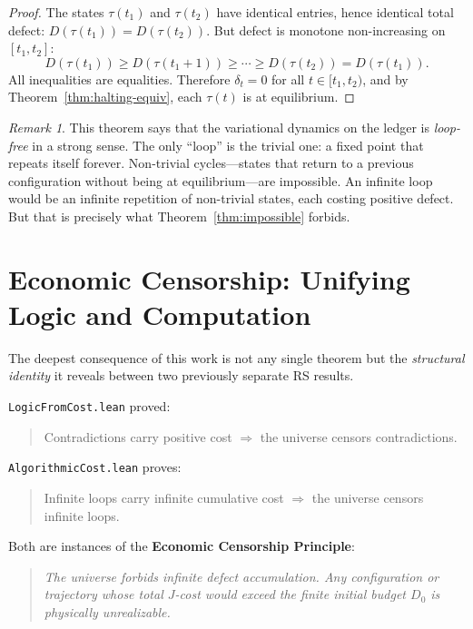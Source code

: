 \documentclass[11pt,a4paper]{article}
\theoremstyle{plain}
\theoremstyle{definition}
\theoremstyle{remark}
\newtheorem{remark}[theorem]{Remark}
\newcommand{\Jcost}{J}
\begin{document}
\begin{proof}
The states $\tau(t_1)$ and $\tau(t_2)$ have identical entries, hence identical total defect: $D(\tau(t_1)) = D(\tau(t_2))$.
But defect is monotone non-increasing on $[t_1, t_2]$:
\[
D(\tau(t_1)) \ge D(\tau(t_1{+}1)) \ge \cdots \ge D(\tau(t_2)) = D(\tau(t_1)).
\]
All inequalities are equalities.
Therefore $\delta_t = 0$ for all $t \in [t_1, t_2)$, and by Theorem~\ref{thm:halting-equiv}, each $\tau(t)$ is at equilibrium.
\end{proof}

\begin{remark}
This theorem says that the variational dynamics on the ledger is \emph{loop-free} in a strong sense.
The only ``loop'' is the trivial one: a fixed point that repeats itself forever.
Non-trivial cycles---states that return to a previous configuration without being at equilibrium---are impossible.
An infinite loop would be an infinite repetition of non-trivial states, each costing positive defect.
But that is precisely what Theorem~\ref{thm:impossible} forbids.
\end{remark}

\section{Economic Censorship: Unifying Logic and Computation}\label{sec:censorship}

The deepest consequence of this work is not any single theorem but the \emph{structural identity} it reveals between two previously separate RS results.

\texttt{LogicFromCost.lean} proved:
\begin{quote}
Contradictions carry positive cost $\Rightarrow$ the universe censors contradictions.
\end{quote}

\texttt{AlgorithmicCost.lean} proves:
\begin{quote}
Infinite loops carry infinite cumulative cost $\Rightarrow$ the universe censors infinite loops.
\end{quote}

Both are instances of the \textbf{Economic Censorship Principle}:

\begin{quote}
\itshape
The universe forbids infinite defect accumulation.
Any configuration or trajectory whose total $\Jcost$-cost would exceed the finite initial budget $D_0$ is physically unrealizable.
\end{quote}
\end{document}
